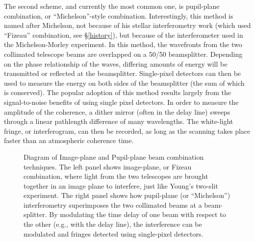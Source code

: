 \documentclass[12pt]{iopart}
\begin{document}
The second scheme, and currently the most common one, is pupil-plane
combination, or ``Michelson''-style combination.  Interestingly, this
method is named after Michelson, not because of his stellar
interferometry work (which used ``Fizeau'' combination, see
\S\ref{history}), but because of the interferometer used in the
Michelson-Morley experiment.  In this method, the wavefronts from the
two collimated telescope beams are overlapped on a 50/50 beamsplitter.
Depending on the phase relationship of the waves, differing amounts of
energy will be transmitted or reflected at the beamsplitter.
Single-pixel detectors can then be used to measure the energy on both
sides of the beamsplitter (the sum of which is conserved).  The
popular adoption of this method results largely from the
signal-to-noise benefits of using single pixel detectors.  In order to
measure the amplitude of the coherence, a dither mirror (often in the
delay line) sweeps through a linear pathlength difference of many
wavelengths. The white-light fringe, or interferogram, can then be
recorded, as long as the scanning takes place faster than an
atmospheric coherence time.


\begin{figure}
\begin{center}
\caption
{Diagram of Image-plane and Pupil-plane beam combination techniques.
  The left panel shows image-plane, or Fizeau combination, where light
  from the two telescopes are brought together in an image plane to
  interfere, just like Young's two-slit experiment.  The right panel
  shows how pupil-plane (or ``Michelson'') interferometry superimposes
  the two collimated beams at a beam-splitter.  By modulating the time
  delay of one beam with respect to the other (e.g., with the delay
  line), the interference can be modulated and fringes detected using
  single-pixel detectors. 
\label{monnier_combiner}}
\end{center}
\end{figure}
\end{document}

